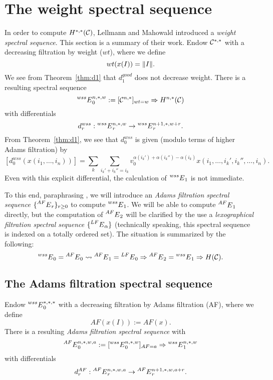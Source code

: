 
\section{The weight spectral sequence}\label{sec:wss}

In order to compute $H^{*,*}(\mathcal{C})$, Lellmann and Mahowald \cite{LM} introduced a \emph{weight spectral sequence}.  This section is a summary of their work.  Endow $\mathcal{C}^{*,*}$ with a decreasing filtration by weight ({$wt$}), where we define
$$ wt(x(I)) = \lVert I \rVert. $$
We see from Theorem~\ref{thm:d1} that $d_1^{good}$ does not decrease weight.  There is a resulting spectral sequence
$$ \prescript{wss}{}{E}_0^{n,*,w} := [\mathcal{C}^{n,*}]_{wt=w} \Rightarrow H^{n,*}(\mathcal{C}) $$
with differentials
$$ d_r^{wss}: \prescript{wss}{}{E}_r^{n,*,w} \rightarrow \prescript{wss}{}{E}_r^{n+1, *, w+r}. $$
From Theorem~\ref{thm:d1}, we see that $d_0^{wss}$ is given (modulo terms of higher Adams filtration) by
\begin{equation}\label{eq:d0wss} 
[d_0^{wss}(x(i_1, \ldots, i_n))] = \sum_k \sum_{i_k'+i_k'' = i_k} v_0^{\alpha(i_k') + \alpha(i_k'')-\alpha(i_k)} x(i_1, \ldots, i_k', i_k'', \ldots, i_n). 
\end{equation}
Even with this explicit differential, the calculation of $\prescript{wss}{}{E}_1$ is not immediate.  

To this end, paraphrasing \cite{LM}, we will introduce an \emph{Adams filtration spectral sequence} $\{\prescript{AF}{}{E}_r\}_{r \ge 0}$ to compute $\prescript{wss}{}{E}_1$.  We will be able to compute $\prescript{AF}{}{E}_1$ directly, but the computation of $\prescript{AF}{}{E}_2$ will be clarified by the use a \emph{lexographical filtration spectral sequence} $\{ \prescript{LF}{}{E}_\alpha\}$ (technically speaking, this spectral sequence is indexed on a totally ordered set).  The situation is summarized by the following:
$$ \prescript{wss}{}{E}_0 = \prescript{AF}{}{E}_0 \rightsquigarrow \prescript{AF}{}{E}_1 = \prescript{LF}{}{E}_0\Rightarrow \prescript{AF}{}{E}_2 = \prescript{wss}{}{E}_1 \Rightarrow H(\mathcal{C}). $$ 


\subsection*{The Adams filtration spectral sequence}

Endow $\prescript{wss}{}{E}_0^{*,*,*}$ with a decreasing filtration by Adams filtration (AF), where we define
$$ AF(x(I)) := AF(x). $$
There is a resulting \emph{Adams filtration spectral sequence} with
$$ \prescript{AF}{}{E}_0^{n,*,w,a} := [\prescript{wss}{}{E}_0^{n,*,w}]_{AF = a} \Rightarrow \prescript{wss}{}{E}_1^{n,*,w} $$
with differentials
$$ d_r^{AF}: \prescript{AF}{}{E}_r^{n,*,w,a} \rightarrow \prescript{AF}{}{E}_r^{n+1, *, w, a+r}. $$

